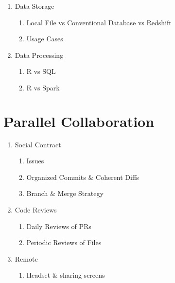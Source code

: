 \documentclass[]{book}
\providecommand{\tightlist}{%
  \setlength{\itemsep}{0pt}\setlength{\parskip}{0pt}}
\theoremstyle{definition}
\theoremstyle{definition}
\theoremstyle{definition}
\theoremstyle{remark}
\begin{document}
\begin{enumerate}
\def\labelenumi{\arabic{enumi}.}
\tightlist
\item
  Data Storage

  \begin{enumerate}
  \def\labelenumii{\arabic{enumii}.}
  \tightlist
  \item
    Local File vs Conventional Database vs Redshift
  \item
    Usage Cases
  \end{enumerate}
\item
  Data Processing

  \begin{enumerate}
  \def\labelenumii{\arabic{enumii}.}
  \tightlist
  \item
    R vs SQL
  \item
    R vs Spark
  \end{enumerate}
\end{enumerate}

\hypertarget{parallel-collaboration}{%
\chapter{Parallel Collaboration}\label{parallel-collaboration}}

\begin{enumerate}
\def\labelenumi{\arabic{enumi}.}
\tightlist
\item
  Social Contract

  \begin{enumerate}
  \def\labelenumii{\arabic{enumii}.}
  \tightlist
  \item
    Issues
  \item
    Organized Commits \& Coherent Diffs
  \item
    Branch \& Merge Strategy
  \end{enumerate}
\item
  Code Reviews

  \begin{enumerate}
  \def\labelenumii{\arabic{enumii}.}
  \tightlist
  \item
    Daily Reviews of PRs
  \item
    Periodic Reviews of Files
  \end{enumerate}
\item
  Remote

  \begin{enumerate}
  \def\labelenumii{\arabic{enumii}.}
  \tightlist
  \item
    Headset \& sharing screens
  \end{enumerate}
\end{enumerate}
\end{document}
